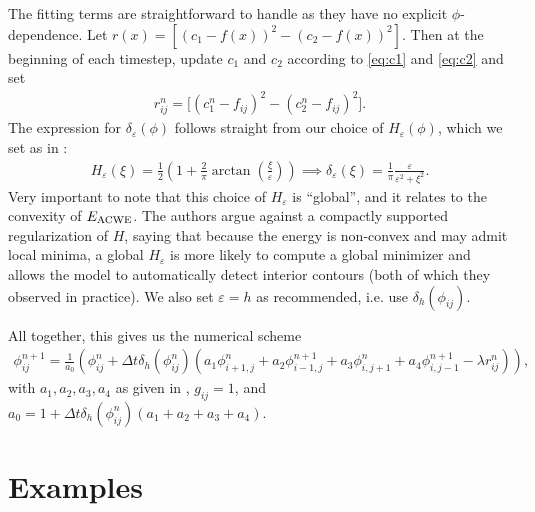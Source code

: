 The fitting terms are straightforward to handle as they have no explicit $\phi$-dependence. Let $r(x) = [(c_1 - f(x))^2 - (c_2 - f(x))^2 ]$. Then at the beginning of each timestep, update $c_1$ and $c_2$ according to \eqref{eq:c1} and \eqref{eq:c2} and set
\begin{align*}
r_{ij}^n = \big[ (c_1^n - f_{ij})^2 - (c_2^n - f_{ij})^2 \big].
\end{align*}
The expression for $\delta_\varepsilon(\phi)$ follows straight from our choice of $H_\varepsilon(\phi)$, which we set as in \cite{chan2001active}:
\begin{align*}
H_\varepsilon(\xi)
 = \frac{1}{2} 
\left(1 + \frac{2}{\pi}\arctan
\left(\frac{\xi}{\varepsilon} 
\right) \right)
\implies 
\delta_\varepsilon(\xi)  
=  \frac{1}{\pi}\frac{\varepsilon}{\varepsilon^2  + \xi^2}.
\end{align*}
Very important to note that this choice of $H_\varepsilon$ is ``global'', and it relates to the convexity of $E_\textrm{ACWE}$. The authors argue against a compactly supported regularization of $H$, saying that because the energy is non-convex and may admit local minima, a global $H_\varepsilon$ is more likely to compute a global minimizer and allows the model to automatically detect interior contours (both of which they observed in practice). We also set $\varepsilon = h$ as recommended, i.e. use $\delta_h(\phi_{ij})$.

All together, this gives us the numerical scheme
\begin{align*}
\phi^{n+1}_{ij} 
= \frac{1}{a_0} 
\left( \phi^n_{ij} + \Delta t \delta_h(\phi_{ij}^n)
\left( a_1 \phi^n_{i+1,j} + a_2 \phi^{n+1}_{i-1,j} + a_3 \phi^{n}_{i,j+1} + a_4 \phi^{n+1}_{i,j-1} 
- \lambda r_{ij}^n
\right)
\right),
\end{align*}
with $a_1, a_2, a_3, a_4$  as given in , $g_{ij} = 1$, and $a_0 = 1 + \Delta t \delta_h(\phi_{ij}^n)(a_1 + a_2 + a_3 + a_4)$.

\section{Examples}

